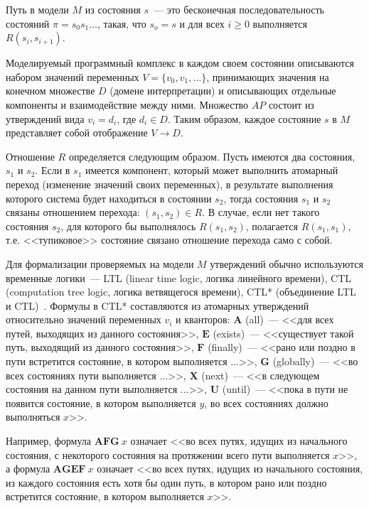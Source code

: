 \documentclass[12pt,a4paper,fleqn]{article}
\begin{document}
Путь в модели $M$ из состояния $s$~--- это бесконечная последовательность состояний $\pi = s_0 s_1 \ldots$, такая, что
$s_o = s$ и для всех $i \geq 0$ выполняется $R(s_i, s_{i+1})$.

Моделируемый программный комплекс в каждом своем состоянии описываются набором значений переменных $V = \{v_0, v_1,
\ldots\}$, принимающих значения на конечном множестве $D$ (домене интерпретации) и описывающих отдельные компоненты и
взаимодействие между ними. Множество $AP$ состоит из утверждений вида $v_i = d_i$, где $d_i \in D$. Таким образом,
каждое состояние $s$ в $M$ представляет собой отображение $V \rightarrow D$.

Отношение $R$ определяется следующим образом. Пусть имеются два состояния, $s_1$ и $s_2$. Если в $s_1$ имеется
компонент, который может выполнить атомарный переход (изменение значений своих переменных), в результате выполнения
которого система будет находиться в состоянии $s_2$, тогда состояния $s_1$ и $s_2$ связаны отношением перехода: $(s_1,
s_2) \in R$. В случае, если нет такого состояния $s_2$, для которого бы выполнялось $R(s_1, s_2)$, полагается $R(s_1,
s_1)$, т.е. <<тупиковое>> состояние связано отношение перехода само с собой.

Для формализации проверяемых на модели $M$ утверждений обычно используются временные логики~--- LTL (linear time logic,
логика линейного времени), CTL (computation tree logic, логика ветвящегося времени), CTL* (объединение LTL и
CTL)~\cite{Clarke, Velder}. Формулы в CTL* составляются из атомарных утверждений относительно значений переменных $v_i$
и кванторов: $\mathbf{A}$ (all)~--- <<для всех путей, выходящих из данного состояния>>, $\mathbf{E}$ (exists)~---
<<существует такой путь, выходящий из данного состояния>>, $\mathbf{F}$ (finally)~--- <<рано или поздно в пути
встретится состояние, в котором выполняется ...>>, $\mathbf{G}$ (globally)~--- <<во всех состояниях пути выполняется
...>>, $\mathbf{X}$ (next)~--- <<в следующем состояния на данном пути выполняется ...>>, $\mathbf{U}$ (until)~--- <<пока
в пути не появится состояние, в котором выполняется $y$, во всех состояниях должно выполняться $x$>>.

Например, формула $\mathbf{AFG}~x$ означает <<во всех путях, идущих из начального состояния, с некоторого состояния на протяжении всего
пути выполняется $x$>>, а формула $\mathbf{AGEF}~x$ означает <<во всех путях, идущих из начального состояния, из каждого состояния есть хотя бы
один путь, в котором рано или поздно встретится состояние, в котором выполняется $x$>>.
\end{document}

